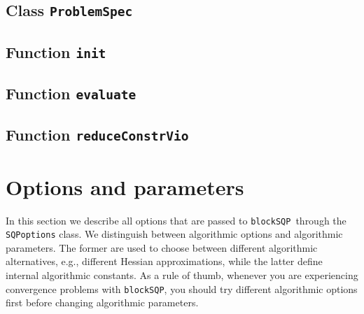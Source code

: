\documentclass[	11pt,
				a4paper,
				abstract=true,
				twoside=true,
				bibliography=totoc, 
				headinclude=true,
				footinclude=false]{scrartcl}
\newcommand{\blockSQP}{\texttt{blockSQP}}
\newcommand{\problem}{\texttt{ProblemSpec}}
\newcommand{\init}{\texttt{init}}
\newcommand{\evaluate}{\texttt{evaluate}}
\newcommand{\reduce}{\texttt{reduceConstrVio}}
\begin{document}
\subsection{Class \problem}


\subsection{Function \init}


\subsection{Function \evaluate}


\subsection{Function \reduce}


\section{Options and parameters}
In this section we describe all options that are passed to \blockSQP\ through the \texttt{SQPoptions} class.
We distinguish between algorithmic options and algorithmic parameters. The former are used to choose between different algorithmic alternatives, e.g., different Hessian approximations, while the latter define internal algorithmic constants. As a rule of thumb, whenever you are experiencing convergence problems with \blockSQP, you should try different algorithmic options first before changing algorithmic parameters.
\end{document}
